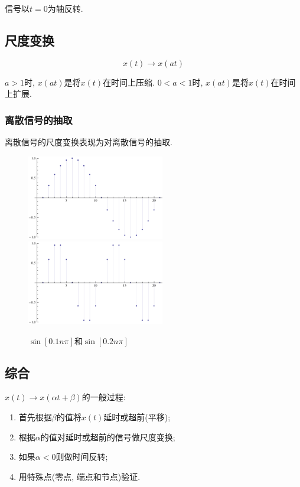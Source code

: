         信号以$t=0$为轴反转.

    \subsection{尺度变换}

        \[x(t)\to x(at)\]

        $a>1$时, $x(at)$是将$x(t)$在时间上压缩. $0<a<1$时, $x(at)$是将$x(t)$在时间上扩展.

        \subsubsection{离散信号的抽取}

            离散信号的尺度变换表现为对离散信号的抽取.

            \begin{figure}[h]\centering
                \includegraphics[width=6cm]{signals_chaps/lect2_inc/dt-time-shift-o.pdf} \raisebox{1.8cm}{$\to$} \includegraphics[width=6cm]{signals_chaps/lect2_inc/dt-time-shift-a.pdf}
                \caption{$\sin[0.1n\pi]$和$\sin[0.2n\pi]$}
                \label{fig:2:dt-time-shift-example}
            \end{figure}

    \subsection{综合}

        $x(t)\to x(\alpha t+\beta)$的一般过程:
        \begin{enumerate}
            \item 首先根据$\beta$的值将$x(t)$延时或超前(平移);
            \item 根据$\alpha$的值对延时或超前的信号做尺度变换;
            \item 如果$\alpha<0$则做时间反转;
            \item 用特殊点(零点, 端点和节点)验证.
        \end{enumerate}

